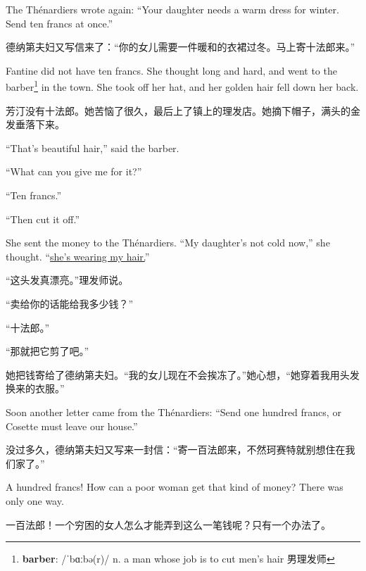 \documentclass[fontset=ubuntu, zihao=5]{ctexart}
\newcommand\doulos[1]{{\fontspec{Doulos SIL} /#1/}}
\begin{document}
\begin{paracol}{2}
  \switchcolumn*

  The Thénardiers wrote again: ``Your daughter needs a warm dress for winter. Send ten francs at once.''

  \switchcolumn

  德纳第夫妇又写信来了：“你的女儿需要一件暖和的衣裙过冬。马上寄十法郎来。”

  \switchcolumn*

  Fantine did not have ten francs. She thought long and hard, and went to the
  barber\footnote{\textbf{barber}: \doulos{ˈbɑːbə(r)} n. a man whose job is
    to cut men's hair 男理发师} in the town. She took off her hat, and her
  golden hair fell down her back.

  \switchcolumn

  芳汀没有十法郎。她苦恼了很久，最后上了镇上的理发店。她摘下帽子，满头的金发垂落下来。

  \switchcolumn*

  ``That's beautiful hair,'' said the barber.


  ``What can you give me for it?''


  ``Ten francs.''


  ``Then cut it off.''


  She sent the money to the Thénardiers. ``My daughter's not cold now,'' she thought. ``\uline{she's wearing my hair.}''

  \switchcolumn

  “这头发真漂亮。”理发师说。


  “卖给你的话能给我多少钱？”


  “十法郎。”


  “那就把它剪了吧。”


  她把钱寄给了德纳第夫妇。“我的女儿现在不会挨冻了。”她心想，“她穿着我用头发换来的衣服。”

  \switchcolumn*

  Soon another letter came from the Thénardiers: ``Send one hundred francs, or Cosette must leave our house.''

  \switchcolumn

  没过多久，德纳第夫妇又写来一封信：“寄一百法郎来，不然珂赛特就别想住在我们家了。”

  \switchcolumn*

  A hundred francs! How can a poor woman get that kind of money? There was only one way.

  \switchcolumn

  一百法郎！一个穷困的女人怎么才能弄到这么一笔钱呢？只有一个办法了。


\end{paracol}
\end{document}
